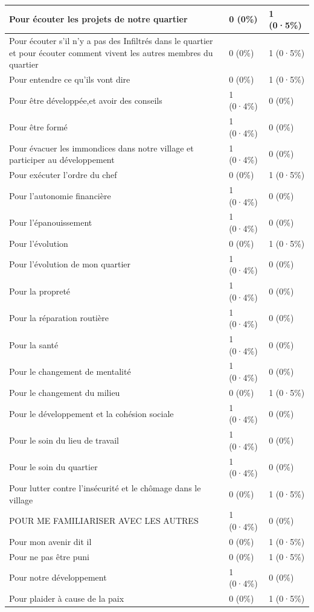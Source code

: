 \documentclass[
]{book}
\begin{document}
\begin{tabular}{l|l|l}
\hline
Pour écouter les projets de notre quartier & 0 (0\%) & 1 (0·5\%)\\
\hline
Pour écouter s'il n'y a pas des Infiltrés dans le quartier et pour écouter comment  vivent les autres membres du quartier & 0 (0\%) & 1 (0·5\%)\\
\hline
Pour entendre ce qu'ils vont dire & 0 (0\%) & 1 (0·5\%)\\
\hline
Pour être développée,et avoir des conseils & 1 (0·4\%) & 0 (0\%)\\
\hline
Pour être formé & 1 (0·4\%) & 0 (0\%)\\
\hline
Pour évacuer les immondices dans notre village et participer au développement & 1 (0·4\%) & 0 (0\%)\\
\hline
Pour exécuter l'ordre du chef & 0 (0\%) & 1 (0·5\%)\\
\hline
Pour l'autonomie financière & 1 (0·4\%) & 0 (0\%)\\
\hline
Pour l'épanouissement & 1 (0·4\%) & 0 (0\%)\\
\hline
Pour l'évolution & 0 (0\%) & 1 (0·5\%)\\
\hline
Pour l'évolution de mon quartier & 1 (0·4\%) & 0 (0\%)\\
\hline
Pour la propreté & 1 (0·4\%) & 0 (0\%)\\
\hline
Pour la réparation routière & 1 (0·4\%) & 0 (0\%)\\
\hline
Pour la santé & 1 (0·4\%) & 0 (0\%)\\
\hline
Pour le changement de mentalité & 1 (0·4\%) & 0 (0\%)\\
\hline
Pour le changement du milieu & 0 (0\%) & 1 (0·5\%)\\
\hline
Pour le développement et la cohésion sociale & 1 (0·4\%) & 0 (0\%)\\
\hline
Pour le soin du lieu de travail & 1 (0·4\%) & 0 (0\%)\\
\hline
Pour le soin du quartier & 1 (0·4\%) & 0 (0\%)\\
\hline
Pour lutter contre l'insécurité et le chômage dans le village & 0 (0\%) & 1 (0·5\%)\\
\hline
POUR ME FAMILIARISER AVEC LES AUTRES & 1 (0·4\%) & 0 (0\%)\\
\hline
Pour mon avenir dit il & 0 (0\%) & 1 (0·5\%)\\
\hline
Pour ne pas être puni & 0 (0\%) & 1 (0·5\%)\\
\hline
Pour notre développement & 1 (0·4\%) & 0 (0\%)\\
\hline
Pour plaider à cause de la paix & 0 (0\%) & 1 (0·5\%)\\

\end{tabular}
\end{document}
